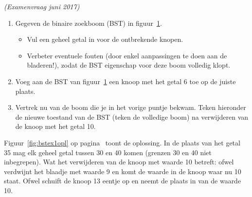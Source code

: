 \begin{oef}
\papier \emph{(Examenvraag juni 2017)}\\
\begin{enumerate}
\item Gegeven de binaire zoekboom (BST) in figuur~\ref{fig:bstex1}. 
\begin{itemize}
\item Vul een geheel getal in voor de ontbrekende knopen. 
\item Verbeter eventuele fouten (door enkel aanpassingen te doen aan de bladeren!), zodat de BST eigenschap voor deze boom volledig klopt.
\end{itemize}
\begin{figure}[htbp]
    \centering
{}
\vspace*{20mm}
\caption{}
    \label{fig:bstex1}
\end{figure}

\item Voeg aan de BST van figuur~\ref{fig:bstex1} een knoop met het getal 6 toe op de juiste plaats.
\item Vertrek nu van de boom die je in het vorige puntje bekwam. Teken hieronder de nieuwe toestand van de BST (teken de volledige boom) na verwijderen van de knoop met het getal 10.
\end{enumerate}

\begin{opl}
Figuur~\ref{fig:bstex1opl} op pagina~\pageref{fig:bstex1opl} toont de oplossing. In de plaats van het getal 35 mag elk geheel getal tussen 30 en 40 komen (grenzen 30 en 40 niet inbegrepen). Wat het verwijderen van de knoop met waarde 10 betreft: ofwel verdwijnt het blaadje met waarde 9 en komt de waarde in de knoop waar nu 10 staat. Ofwel schuift de knoop 13 eentje op en neemt de plaats in van de waarde 10.
\begin{figure}[htbp]
    \centering
{}


\end{figure}
\end{opl}
\end{oef}
